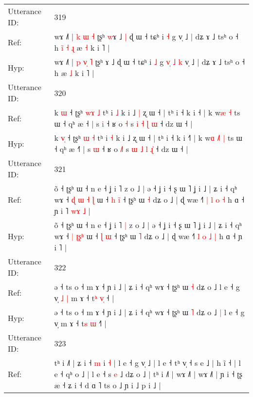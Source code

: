 \documentclass[10pt]{article}
\DeclareRobustCommand{\hl}[1]{{\textcolor{red}{#1}}}
\begin{document}
\begin{longtable}{ll}
 \\
\midrule
Utterance ID: & 319 \\
Ref: & wɤ ˩˥ | \hl{k} \hl{}\hl{ɯ} \hl{˧} ʈʂʰ \hl{w}ɤ ˩\hl{ }\hl{|} ɖ ɯ ˧ tɕʰ i \hl{˧} g\hl{}\hl{}\hl{}\hl{}\hl{}\hl{}\hl{} v̩ ˩ | dʑ ɤ ˩ tsʰ o ˧ h\hl{ }\hl{i}\hl{̃}\hl{ }\hl{˧}\hl{ }\hl{ɻ} æ \hl{˧} k i ˥ |
 \\
Hyp: & wɤ ˩˥ | \hl{p} \hl{v}\hl{̩} \hl{˥} ʈʂʰ \hl{}ɤ ˩\hl{}\hl{} ɖ ɯ ˧ tɕʰ i \hl{˩} g\hl{ }\hl{v}\hl{̩}\hl{ }\hl{˩}\hl{ }\hl{k} v̩ ˩ | dʑ ɤ ˩ tsʰ o ˧ h\hl{}\hl{}\hl{}\hl{}\hl{}\hl{}\hl{} æ \hl{˩} k i ˥ |
 \\
\midrule
Utterance ID: & 320 \\
Ref: & k \hl{}\hl{ɯ} ˧ ʈʂʰ \hl{w}\hl{ɤ} \hl{˩} tʰ i \hl{˩} k i ˩\hl{ }\hl{|} ʐ ɯ ˧ | tʰ i ˧ k i ˧\hl{} | k w\hl{}\hl{}\hl{}\hl{æ} \hl{˧} ts ɯ ˧ qʰ æ ˧\hl{} | s \hl{i} ˧ ʁ o \hl{}\hl{˧} s \hl{i} \hl{˧} \hl{ɭ} \hl{}\hl{ɯ} ˧ dz ɯ ˧ |
 \\
Hyp: & k \hl{v}\hl{̩} ˧ ʈʂʰ \hl{}\hl{ɯ} \hl{˧} tʰ i \hl{˧} k i ˩\hl{}\hl{} ʐ ɯ ˧ | tʰ i ˧ k i ˧\hl{˥} | k w\hl{ɑ}\hl{ }\hl{˩}\hl{˥} \hl{|} ts ɯ ˧ qʰ æ ˧\hl{˥} | s \hl{ɯ} ˧ ʁ o \hl{˩}\hl{˥} s \hl{ɯ} \hl{˩} \hl{l} \hl{ɻ}\hl{̍} ˧ dz ɯ ˧ |
 \\
\midrule
Utterance ID: & 321 \\
Ref: & õ ˧ ʈʂʰ ɯ ˧ n e ˧ ʝ i ˥\hl{}\hl{} z o ˩ | ə ˧ ʝ i ˧ ʂ ɯ ˥ ʝ i ˩ | ʑ i ˧ qʰ wɤ ˧\hl{ }\hl{ɖ} \hl{ɯ} \hl{˧}\hl{ }\hl{ɭ} ɯ ˧ \hl{h} \hl{i}\hl{̃} ˧ ʈʂʰ ɯ \hl{˧} dʑ o ˩ | ɖ wæ ˧˥ \hl{|} \hl{l} \hl{o} \hl{˧} h ɑ ˧ ɲ i ˥\hl{ }\hl{w}\hl{ɤ}\hl{ }\hl{˩} |
 \\
Hyp: & õ ˧ ʈʂʰ ɯ ˧ n e ˧ ʝ i ˥\hl{ }\hl{|} z o ˩ | ə ˧ ʝ i ˧ ʂ ɯ ˥ ʝ i ˩ | ʑ i ˧ qʰ wɤ ˧\hl{}\hl{} \hl{|} \hl{ʈ}\hl{ʂ}\hl{ʰ} ɯ ˧ \hl{ɭ} \hl{}\hl{ɯ} ˧ ʈʂʰ ɯ \hl{˥} dʑ o ˩ | ɖ wæ ˧˥ \hl{l} \hl{o} \hl{˩} \hl{|} h ɑ ˧ ɲ i ˥\hl{}\hl{}\hl{}\hl{}\hl{} |
 \\
\midrule
Utterance ID: & 322 \\
Ref: & ə ˧ ts o ˧ m ɤ ˧ ɲ i ˩ | ʑ i ˧ qʰ wɤ ˧ ʈʂʰ ɯ \hl{˧} dʑ o ˩\hl{}\hl{} l e ˧ g v̩\hl{ }\hl{˩}\hl{ }\hl{|} m ɤ ˧ t\hl{ʰ} \hl{v}\hl{̩} ˧\hl{} |
 \\
Hyp: & ə ˧ ts o ˧ m ɤ ˧ ɲ i ˩ | ʑ i ˧ qʰ wɤ ˧ ʈʂʰ ɯ \hl{˥} dʑ o ˩\hl{ }\hl{|} l e ˧ g v̩\hl{}\hl{}\hl{}\hl{} m ɤ ˧ t\hl{s} \hl{}\hl{ɯ} ˧\hl{˥} |
 \\
\midrule
Utterance ID: & 323 \\
Ref: & tʰ i ˩˥ | ʑ i ˧ \hl{m} i \hl{˧} | l e ˧ g v̩ ˩ | l e ˧ tʰ v̩ ˧ s e ˩ | h ĩ ˧ | l e ˧ qʰ o ˩ | l e ˧ s \hl{e} ˩ dʑ o ˩ | tʰ i ˩˥ | wɤ ˩˥ | wɤ ˩˥\hl{}\hl{}\hl{}\hl{} | ɲ i ˧ ʈʂ æ ˧ ʑ i ˧ d ɑ ˥ ts o ˩ ɲ i ˩ p i ˩ |

\end{longtable}
\end{document}
